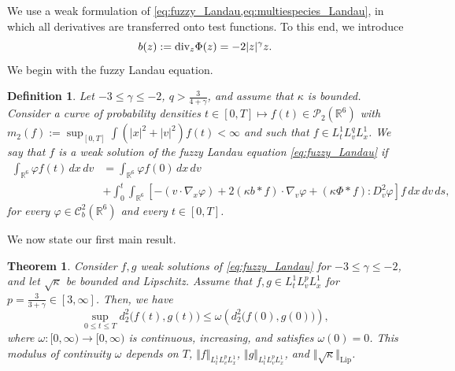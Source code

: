\documentclass[10pt,oneside]{amsart}
\numberwithin{equation}{section}
\newtheorem{definition}{Definition}
\numberwithin{definition}{section}
\newtheorem{theorem}{Theorem}
\numberwithin{theorem}{section}
\numberwithin{lemma}{section}
\begin{document}
We use a weak formulation of \cref{eq:fuzzy_Landau,eq:multiespecies_Landau}, in which all derivatives are transferred onto test functions. To this end, we introduce
%
\begin{equation*}
b(z):=\textnormal{div}_z \Phi(z) = -2 |z|^\gamma z.
\end{equation*}
%
We begin with the fuzzy Landau equation.
% 
\begin{definition}\label{defn:weak_sol_fuzzy}
  Let $-3\leq \gamma \leq -2$, $q>\frac{3}{4+\gamma}$, and assume that $\kappa$ is bounded. Consider a curve of probability densities $t\in [0,T]\mapsto f(t)\in \mathcal P_2(\mathbb R^6)$ with $m_2(f):=\sup_{[0,T]}\int (|x|^2+|v|^2)f(t)<\infty$ and such that $f\in L^1_t L^q_v L^1_x$. We say that $f$ is a weak solution of the fuzzy Landau equation \cref{eq:fuzzy_Landau} if
  \begin{align*}
    \int_{\mathbb{R}^{6}}\varphi f(t)\,dx\,dv &
    = \int_{\mathbb{R}^{6}}\varphi f(0)\,dx\,dv	\\
    &+\int_0^t\int_{\mathbb{R}^{6}}\left[-\left(v\cdot\nabla_{x}\varphi\right)+2(\kappa b*f)\cdot\nabla_{v}\varphi+\left(\kappa\Phi*f\right):D_{v}^{2}\varphi\right]f\,dx\,dv\,ds,
  \end{align*}
  for every $\varphi\in\mathcal{C}_{b}^{2}(\mathbb{R}^{6})$ and every $t\in [0,T]$.
\end{definition}
% 
We now state our first main result.
% 
\begin{theorem}\label{thm:fuzzy}
  Consider $f,g$ weak solutions of \eqref{eq:fuzzy_Landau} for $-3\leq \gamma \leq -2$, and let $\sqrt{\kappa}$ be bounded and Lipschitz. Assume that $f,g\in L^1_t L^p_v L^1_x$ for $p=\frac{3}{3+\gamma}\in [3,\infty]$. Then, we have
  \begin{equation*}
    \sup_{0\leq t\leq T}d_2^2\big(f(t),g(t)\big) \leq \omega \left(d_2^2\big(f(0),g(0)\big)\right),
  \end{equation*}
  where $\omega:[0,\infty)\longrightarrow[0,\infty)$ is continuous, increasing, and satisfies $\omega(0)=0$. This modulus of continuity $\omega$ depends on $T$, $\Vert f\Vert_{L^1_tL^p_vL^1_x}$, $\Vert g\Vert_{L^1_tL^p_vL^1_x}$, and $\Vert\sqrt{\kappa}\Vert_{\mathrm{Lip}}$.
\end{theorem}
% 
\end{document}
